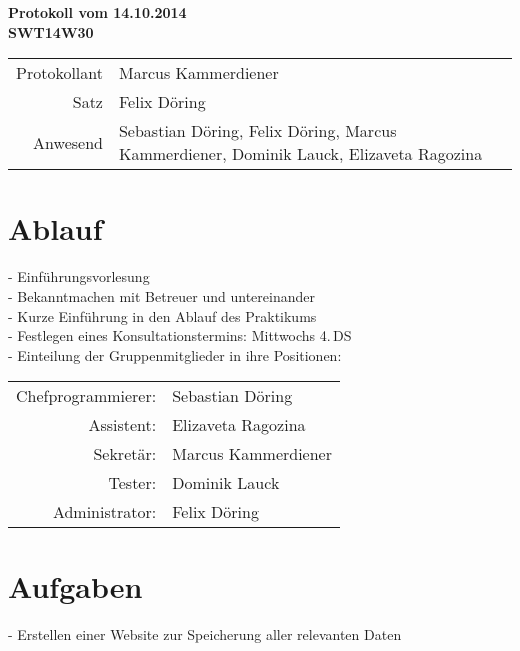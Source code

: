 \documentclass{scrartcl}
\begin{document}
\begin{center}
\LARGE \bf{Protokoll vom 14.10.2014 \\
SWT14W30}
\end{center}

\begin{tabular}{rp{10cm}}
Protokollant & Marcus Kammerdiener \\
Satz & Felix Döring \\
Anwesend & Sebastian Döring, Felix Döring, Marcus Kammerdiener, Dominik Lauck, Elizaveta Ragozina \\
\end{tabular}

\vspace*{3em}

\section*{Ablauf}
\begin{flushleft}
- Einführungsvorlesung \\
- Bekanntmachen mit Betreuer und untereinander \\
- Kurze Einführung in den Ablauf des Praktikums \\
- Festlegen eines Konsultationstermins: Mittwochs 4.\,DS \\
- Einteilung der Gruppenmitglieder in ihre Positionen: \\
\begin{tabular}{rp{10cm}}
Chefprogrammierer: & Sebastian Döring \\
Assistent: & Elizaveta Ragozina \\
Sekretär: & Marcus Kammerdiener \\
Tester: & Dominik Lauck \\
Administrator: & Felix Döring \\
\end{tabular}
\end{flushleft}

\vspace*{2em}

\section*{Aufgaben}
- Erstellen einer Website zur Speicherung aller relevanten Daten
\end{document}
